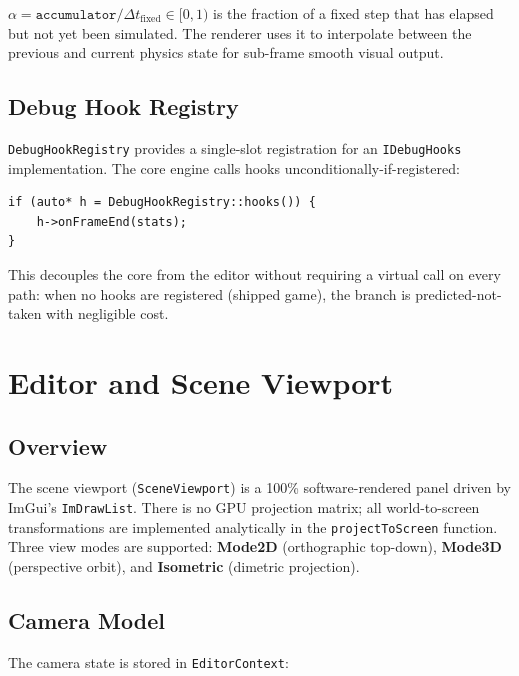 \documentclass[12pt, a4paper]{report}
\theoremstyle{definition}
\theoremstyle{remark}
\begin{document}
$\alpha = \texttt{accumulator} / \Delta t_\text{fixed} \in [0, 1)$
is the fraction of a fixed step that has elapsed but not yet been
simulated. The renderer uses it to interpolate between the previous
and current physics state for sub-frame smooth visual output.

\section{Debug Hook Registry}

\texttt{DebugHookRegistry} provides a single-slot registration for an
\texttt{IDebugHooks} implementation. The core engine calls hooks
unconditionally-if-registered:

\begin{lstlisting}[caption={Zero-overhead hook call pattern}]
if (auto* h = DebugHookRegistry::hooks()) {
    h->onFrameEnd(stats);
}
\end{lstlisting}

This decouples the core from the editor without requiring a virtual
call on every path: when no hooks are registered (shipped game), the
branch is predicted-not-taken with negligible cost.

\chapter{Editor and Scene Viewport}

\section{Overview}

The scene viewport (\texttt{SceneViewport}) is a 100\% software-rendered
panel driven by ImGui's \texttt{ImDrawList}. There is no GPU projection
matrix; all world-to-screen transformations are implemented analytically
in the \texttt{projectToScreen} function. Three view modes are supported:
\textbf{Mode2D} (orthographic top-down), \textbf{Mode3D} (perspective
orbit), and \textbf{Isometric} (dimetric projection).

\section{Camera Model}

The camera state is stored in \texttt{EditorContext}:
\end{document}
